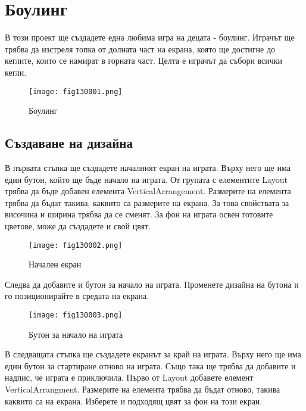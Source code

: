 \chapter{Боулинг}

В този проект ще създадете една любима игра на децата - боулинг. Играчът ще трябва да изстреля топка от долната част на екрана, която ще достигне до кеглите, които се намират в горната част. Целта е играчът да събори всички кегли.

\begin{figure}[H]
  \centering
  \texttt{[image: fig130001.png]}
  \caption{Боулинг}
\label{fig130001}
\end{figure}

\section{Създаване на дизайна}

В първата стъпка ще създадете началният екран на играта. Върху него ще има един бутон, който ще бъде начало на играта. От групата с елементите Layout трябва да бъде добавен елемента VerticalArrangement. Размерите на елемента трябва да бъдат такива, каквито са размерите на екрана. За това свойствата за височина и ширина трябва да се сменят. За фон на играта освен готовите цветове, може да създадете и свой цвят.

\begin{figure}[H]
  \centering
  \texttt{[image: fig130002.png]}
  \caption{Начален екран}
\label{fig130002}
\end{figure}

Следва да добавите и бутон за начало на играта. Променете дизайна на бутона и го позиционирайте в средата на екрана.

\begin{figure}[H]
  \centering
  \texttt{[image: fig130003.png]}
  \caption{Бутон за начало на играта}
\label{fig130003}
\end{figure}

В следващата стъпка ще създадете екранът за край на играта. Върху него ще има един бутон за стартиране отново на играта. Също така ще трябва да добавите и надпис, че играта е приключила. Първо от Layout добавете елемент VerticalArrangment. Размерите на елемента трябва да бъдат отново, такива каквито са на екрана. Изберете и подходящ цвят за фон на този екран.

